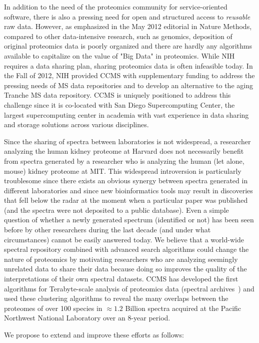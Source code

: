 \documentclass[arial,11pt]{article}
\begin{document}
In addition to the need of the proteomics community for service-oriented software, there is also a pressing need for open and structured access to {\em reusable} raw data. However, as emphasized in the May 2012 editorial in Nature Methods, compared to other data-intensive research, such as genomics, deposition of original proteomics data is poorly organized and there are hardly any algorithms available to capitalize on the value of "Big Data" in proteomics. While NIH requires a data sharing plan, sharing proteomics data is often infeasible today. In the Fall of 2012, NIH provided CCMS with supplementary funding to address the pressing needs of MS data repositories and to develop an alternative to the aging Tranche MS data repository. CCMS is uniquely positioned to address this challenge since it is co-located with San Diego Supercomputing Center, the largest supercomputing center in academia with vast experience in data sharing and storage solutions across various disciplines.

Since the sharing of spectra between laboratories is not widespread, a researcher analyzing the human kidney proteome at Harvard does not necessarily benefit from spectra generated by a researcher who is analyzing the human (let alone, mouse) kidney proteome at MIT. This widespread introversion is particularly troublesome since there exists an obvious synergy between spectra generated in different laboratories and since new bioinformatics tools may result in discoveries that fell below the radar at the moment when a particular paper was published (and the spectra were not deposited to a public database). Even a simple question of whether a newly generated spectrum (identified or not) has been seen before by other researchers during the last decade (and under what circumstances) cannot be easily answered today. We believe that a world-wide spectral repository combined with advanced search algorithms could change the nature of proteomics by motivating researchers who are analyzing seemingly unrelated data to share their data because doing so improves the quality of the interpretations of their own spectral datasets. CCMS has developed the first algorithms for Terabyte-scale analysis of proteomics data (spectral archives~\cite{frank11}) and used these clustering algorithms to reveal the many overlaps between the proteomes of over 100 species in $\approx 1.2$ Billion spectra acquired at the Pacific Northwest National Laboratory over an 8-year period.

We propose to extend and improve these efforts as follows:
\end{document}
